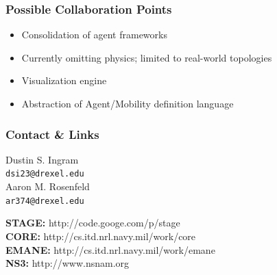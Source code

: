 \documentclass[mathserif]{beamer}
\begin{document}
\frame
{
    \frametitle{Possible Collaboration Points}
    \begin{itemize}
	\item Consolidation of agent frameworks
	\item Currently omitting physics; limited to real-world topologies
	\item Visualization engine
	\item Abstraction of Agent/Mobility definition language
    \end{itemize}
}

\frame
{
    \frametitle{Contact \& Links}
    \begin{center}
	Dustin S. Ingram\\
	\texttt{dsi23@drexel.edu} \\

	Aaron M. Rosenfeld \\
	\texttt{ar374@drexel.edu} \\
    \end{center}

    \textbf{STAGE:} http://code.googe.com/p/stage \\
    \textbf{CORE:} http://cs.itd.nrl.navy.mil/work/core \\
    \textbf{EMANE:} http://cs.itd.nrl.navy.mil/work/emane \\
    \textbf{NS3:} http://www.nsnam.org  \\
}
\end{document}
